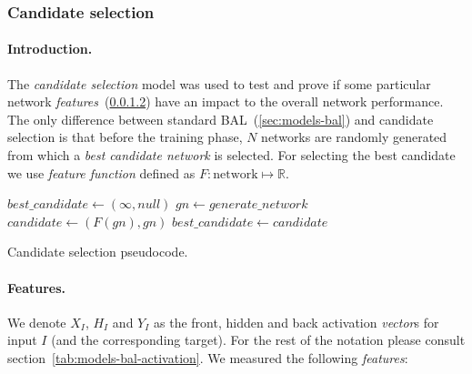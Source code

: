 \subsubsection{Candidate selection} 
\label{sec:sim-exp-candidates}

\paragraph{Introduction.} 
The \emph{candidate selection} model was used to test and prove if some particular network \emph{features}~(\ref{sec:our-candidates-features}) have an impact to the overall network performance. The only difference between standard BAL~(\ref{sec:models-bal}) and candidate selection is that before the training phase, $N$ networks are randomly generated from which a \emph{best candidate network} is selected. For selecting the best candidate we use \emph{feature function} defined as $F: \mbox{network} \mapsto \mathbb{R}$. 

\begin{algorithm}[H]
  \begin{algorithmic}
    \State $best\_candidate \gets (\infty, null)$
      \State $gn \gets generate\_network$
      \State $candidate \gets (F(gn), gn)$
        \State $best\_candidate \gets candidate$
      \EndIf
    \EndFor
  \caption{Candidate selection pseudocode.}
  \label{alg:our-candidates-pseudocode} 
  \end{algorithmic}
\end{algorithm} 

\paragraph{Features.}
\label{sec:our-candidates-features}

We denote $X_I$, $H_I$ and $Y_I$ as the front, hidden and back activation \emph{vector}s for input $I$ (and the corresponding target). For the rest of the notation please consult section~\ref{tab:models-bal-activation}. We measured the following \emph{features}: 


